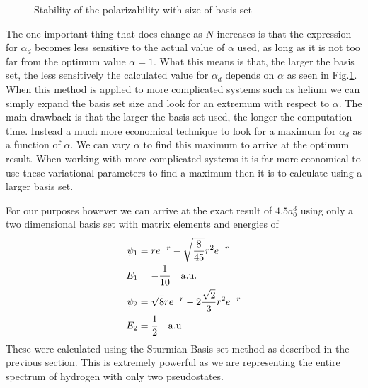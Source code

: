 \begin{figure}
    \centering
    \caption{Stability of the polarizability with size of basis set}
    \label{fig:Dipole Polarizability MAXPOW}
\end{figure}
The one important thing that does change as $N$ increases is that the expression for $\alpha_d$ becomes less sensitive to the actual value of $\alpha$ used, as long as it is not too far from the optimum value $\alpha=1$. What this means is that, the larger the basis set, the less sensitively the calculated value for $\alpha_d$ depends on $\alpha$ as seen in Fig.\ref{fig:Dipole Polarizability MAXPOW}. When this method is applied to more complicated systems such as helium we can simply expand the basis set size and look for an extremum with respect to \(\alpha\). The main drawback is that the larger the basis set used, the longer the computation time. Instead a much more economical technique to look for a maximum for $\alpha_d$ as a function of $\alpha$. We can vary \(\alpha\) to find this maximum to arrive at the optimum result. When working with more complicated systems it is far more economical to use these variational parameters to find a maximum then it is to calculate using a larger basis set.

For our purposes however we can arrive at the exact result of \(4.5a_{0}^{3}\) using only a two dimensional basis set with matrix elements and energies of \cite{variational}
\begin{equation}
\begin{split}
    \psi_1&=re^{-r}-\sqrt{\frac{8}{45}}r^2 e^{-r}\\
    E_1&=-\frac{1}{10}\quad \rm{a.u.}\\
    \psi_2&=\sqrt{8} re^{-r}-2\frac{\sqrt{2}}{3}r^2 e^{-r}\\
    E_2&=\frac{1}{2}\quad \rm{a.u.}\\
\end{split}
\end{equation}
These were calculated using the Sturmian Basis set method as described in the previous section. This is extremely powerful as we are representing the entire spectrum of hydrogen with only two pseudostates.